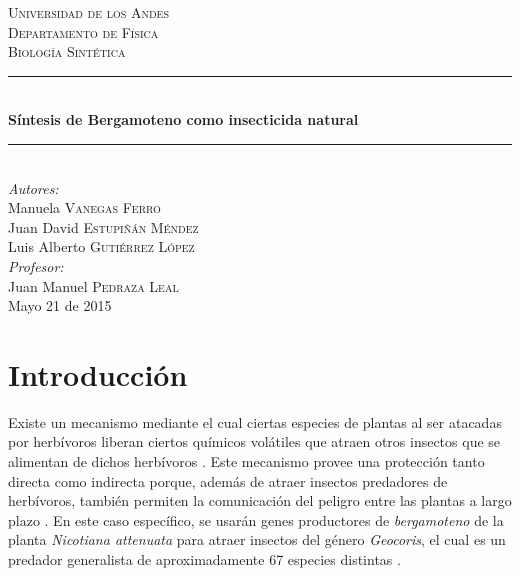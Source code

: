 \documentclass[12pt]{article}
\begin{document}
\begin{titlepage}

\newcommand{\HRule}{\rule{\linewidth}{0.5mm}}

\center

\textsc{\LARGE Universidad de los Andes}\\[1.5cm]
\textsc{\Large Departamento de F\'isica}\\[0.5cm]
\textsc{\large Biolog\'ia Sint\'etica}\\[0.5cm] 

\HRule \\[0.4cm]
{ \huge \bfseries S\'intesis de Bergamoteno como insecticida natural}\\[0.4cm]
\HRule \\[1.5cm]
 

\Large \emph{Autores:}\\
Manuela \textsc{Vanegas Ferro}\\
Juan David \textsc{Estupi\~n\'an M\'endez}\\
Luis Alberto \textsc{Guti\'errez L\'opez}\\[2cm]

\Large \emph{Profesor:}\\
Juan Manuel \textsc{Pedraza Leal}\\[3cm]


{\large Mayo 21 de 2015}\\[2cm]

\vfill

\end{titlepage}

\tableofcontents
\pagebreak

\section{Introducci\'on}

Existe un mecanismo mediante el cual ciertas especies de plantas al ser atacadas por herbívoros liberan ciertos químicos volátiles que atraen otros insectos que se alimentan de dichos herbívoros \cite{kressler01} \cite{taiz10} \cite{takabayashi96} \cite{turlings95} . Este mecanismo provee una protección tanto directa como indirecta porque, además de atraer insectos predadores de herb\'ivoros, también permiten la comunicación del peligro entre las plantas a largo plazo \cite{kressler01} \cite{taiz10}. En este caso específico, se usarán genes productores de \emph{bergamoteno} de la planta \emph{Nicotiana attenuata} para atraer insectos del género \emph{Geocoris}, el cual es un predador generalista de aproximadamente 67 especies distintas \cite{crocker80}.\\
\end{document}
